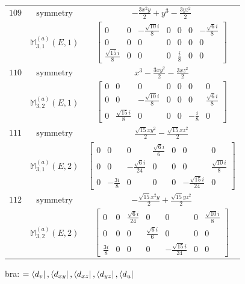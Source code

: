 \documentclass[fleqn,8pt,landscape]{jsarticle}
\begin{document}
\begin{longtable}{ccc}
$ 109 $ & $ \text{symmetry} $ & $ - \frac{3 x^{2} y}{2} + y^{3} - \frac{3 y z^{2}}{2} $ \\
$  $ & $ \mathbb{M}_{3,1}^{(a)}(E,1) $ & $ \begin{bmatrix} 0 & 0 & - \frac{\sqrt{10} i}{8} & 0 & 0 & 0 & - \frac{\sqrt{6} i}{8} \\ 0 & 0 & 0 & 0 & 0 & 0 & 0 \\ \frac{\sqrt{15} i}{8} & 0 & 0 & 0 & \frac{i}{8} & 0 & 0 \end{bmatrix} $ \\ \hline
$ 110 $ & $ \text{symmetry} $ & $ x^{3} - \frac{3 x y^{2}}{2} - \frac{3 x z^{2}}{2} $ \\
$  $ & $ \mathbb{M}_{3,2}^{(a)}(E,1) $ & $ \begin{bmatrix} 0 & 0 & 0 & 0 & 0 & 0 & 0 \\ 0 & 0 & - \frac{\sqrt{10} i}{8} & 0 & 0 & 0 & \frac{\sqrt{6} i}{8} \\ 0 & \frac{\sqrt{15} i}{8} & 0 & 0 & 0 & - \frac{i}{8} & 0 \end{bmatrix} $ \\ \hline
$ 111 $ & $ \text{symmetry} $ & $ \frac{\sqrt{15} x y^{2}}{2} - \frac{\sqrt{15} x z^{2}}{2} $ \\
$  $ & $ \mathbb{M}_{3,1}^{(a)}(E,2) $ & $ \begin{bmatrix} 0 & 0 & 0 & \frac{\sqrt{6} i}{6} & 0 & 0 & 0 \\ 0 & 0 & - \frac{\sqrt{6} i}{24} & 0 & 0 & 0 & \frac{\sqrt{10} i}{8} \\ 0 & - \frac{3 i}{8} & 0 & 0 & 0 & - \frac{\sqrt{15} i}{24} & 0 \end{bmatrix} $ \\ \hline
$ 112 $ & $ \text{symmetry} $ & $ - \frac{\sqrt{15} x^{2} y}{2} + \frac{\sqrt{15} y z^{2}}{2} $ \\
$  $ & $ \mathbb{M}_{3,2}^{(a)}(E,2) $ & $ \begin{bmatrix} 0 & 0 & \frac{\sqrt{6} i}{24} & 0 & 0 & 0 & \frac{\sqrt{10} i}{8} \\ 0 & 0 & 0 & \frac{\sqrt{6} i}{6} & 0 & 0 & 0 \\ \frac{3 i}{8} & 0 & 0 & 0 & - \frac{\sqrt{15} i}{24} & 0 & 0 \end{bmatrix} $ \\ \hline
\end{longtable}
bra: $=\bra{d_{v}}, \bra{d_{xy}}, \bra{d_{xz}}, \bra{d_{yz}}, \bra{d_{u}}$
\end{document}
